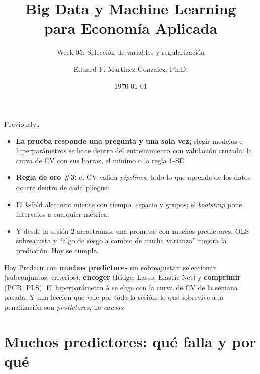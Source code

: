 \documentclass{beamer}
\title[BDML]{Big Data y Machine Learning \\ para Economía Aplicada}
\subtitle{Week 05: Selección de variables y regularización}
\author{Eduard F. Martinez Gonzalez, Ph.D.}
\institute[]{Departamento de Economía, Universidad Icesi}
\date{\today}
\newcommand{\1}{\mathbb{I}}
\begin{document}
\begin{frame}
\titlepage
\end{frame}

\begin{frame}{Previously\ldots}
\small
\begin{itemize}\itemsep4pt
  \item \textbf{La prueba responde una pregunta y una sola vez;} elegir modelos e hiperparámetros se hace dentro del entrenamiento con validación cruzada: la curva de CV con sus barras, el mínimo o la regla 1-SE. \pause
  \item \textbf{Regla de oro \#3:} el CV valida \emph{pipelines}: todo lo que aprende de los datos ocurre dentro de cada pliegue. \pause
  \item El $k$-fold aleatorio miente con tiempo, espacio y grupos; el \emph{bootstrap} pone intervalos a cualquier métrica. \pause
  \item Y desde la sesión 2 arrastramos una promesa: con muchos predictores, OLS sobreajusta y ``algo de sesgo a cambio de mucha varianza'' mejora la predicción. Hoy se cumple.
\end{itemize}
\pause
\begin{block}{Hoy}
Predecir con \textbf{muchos predictores} sin sobreajustar: seleccionar (subconjuntos, criterios), \textbf{encoger} (Ridge, Lasso, Elastic Net) y \textbf{comprimir} (PCR, PLS). El hiperparámetro $\lambda$ se elige con la curva de CV de la semana pasada. Y una lección que vale por toda la sesión: lo que sobrevive a la penalización son \emph{predictores}, no \emph{causas}.
\end{block}
\end{frame}


\section{Muchos predictores: qué falla y por qué}
\begin{frame}[noframenumbering]
\tableofcontents[currentsection]
\end{frame}
\end{document}
